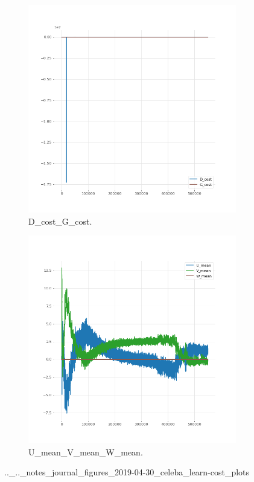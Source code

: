 \begin{figure}[!htbp]
   \centering
\begin{subfigure}[t]{0.48\textwidth}
   \includegraphics[width=\textwidth,center]{2019-04-30/celeba/learn-cost/plots/D_cost_G_cost.png}
   \caption{D_cost_G_cost.}
   \label{fig:.._.._notes_journal_figures_2019-04-30_celeba_learn-cost_plots-a}
\end{subfigure}
\begin{subfigure}[t]{0.48\textwidth}
   \includegraphics[width=\textwidth,center]{2019-04-30/celeba/learn-cost/plots/U_mean_V_mean_W_mean.png}
   \caption{U_mean_V_mean_W_mean.}
   \label{fig:.._.._notes_journal_figures_2019-04-30_celeba_learn-cost_plots-b}
\end{subfigure}
   \caption{.._.._notes_journal_figures_2019-04-30_celeba_learn-cost_plots}
   \label{fig:2019-04-30_celeba_learn-cost_plots}
\end{figure}
